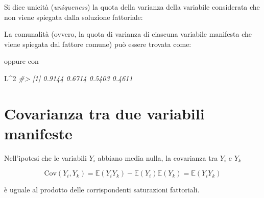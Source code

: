 \documentclass[
  11pt,
]{krantz}
\makeatletter
\newenvironment{Shaded}{\begin{snugshade}}{\end{snugshade}}
\newcommand{\CommentTok}[1]{\textcolor[rgb]{0.37,0.37,0.37}{\textit{#1}}}
\newcommand{\DecValTok}[1]{\textcolor[rgb]{0.06,0.06,0.06}{#1}}
\newcommand{\FunctionTok}[1]{\textcolor[rgb]{0,0,0}{#1}}
\newcommand{\NormalTok}[1]{#1}
\newcommand{\SpecialCharTok}[1]{\textcolor[rgb]{0,0,0}{#1}}
\newenvironment{kframe}{%
\medskip{}
\setlength{\fboxsep}{.8em}
 \def\at@end@of@kframe{}%
 \ifinner\ifhmode%
  \def\at@end@of@kframe{\end{minipage}}%
  \begin{minipage}{\columnwidth}%
 \fi\fi%
 \def\FrameCommand##1{\hskip\@totalleftmargin \hskip-\fboxsep
 \colorbox{shadecolor}{##1}\hskip-\fboxsep
     \hskip-\linewidth \hskip-\@totalleftmargin \hskip\columnwidth}%
 \MakeFramed {\advance\hsize-\width
   \@totalleftmargin\z@ \linewidth\hsize
   \@setminipage}}%
 {\par\unskip\endMakeFramed%
 \at@end@of@kframe}
\renewenvironment{Shaded}{\begin{kframe}}{\end{kframe}}
\newcommand{\E}{\mathbb{E}} %
\theoremstyle{definition}
\theoremstyle{definition}
\theoremstyle{definition}
\theoremstyle{definition}
\theoremstyle{remark}
\makeatother
\begin{document}
Si dice unicità (\emph{uniqueness}) la quota della varianza della variabile considerata che non viene spiegata dalla soluzione fattoriale:

\begin{Shaded}
\end{Shaded}

La comunalità (ovvero, la quota di varianza di ciascuna variabile manifesta che viene spiegata dal fattore comune) può essere trovata come:

\begin{Shaded}
\end{Shaded}

oppure con

\begin{Shaded}
\begin{Highlighting}[]
\NormalTok{L}\SpecialCharTok{\^{}}\DecValTok{2}
\CommentTok{\#\textgreater{} [1] 0.9144 0.6714 0.5403 0.4611}
\end{Highlighting}
\end{Shaded}

\hypertarget{covarianza-tra-due-variabili-manifeste}{%
\section{Covarianza tra due variabili manifeste}\label{covarianza-tra-due-variabili-manifeste}}

Nell'ipotesi che le variabili \(Y_i\) abbiano media nulla, la covarianza tra \(Y_i\) e \(Y_k\)

\[
\mbox{Cov}(Y_i, Y_k)=\E(Y_i Y_k) -
\E(Y_i)\E(Y_k)=\E(Y_i Y_k)
\]

è uguale al prodotto delle corrispondenti saturazioni fattoriali.
\end{document}

